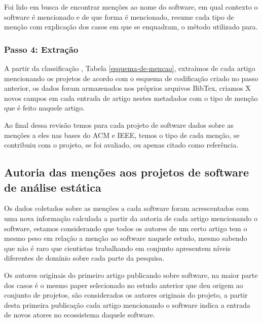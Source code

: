 Foi lido em busca de encontrar menções ao nome do software, em qual contexto o
software é mencionado e de que forma é mencionado, resume cada tipo de menção com explicação dos casos em
que se enquadram, o método utilizado para.

\subsubsection{Passo 4: Extração}

A partir da classificação , Tabela \ref{esquema-de-mencao}, extraímos de cada
artigo mencionando os projetos de acordo com o esquema de codificação criado no
passo anterior, os dados foram armazenados nos próprios arquivos BibTex,
criamos X novos campos em cada entrada de artigo nestes metadados com o tipo de
menção que é feito naquele artigo.

Ao final dessa revisão temos para cada projeto de software dados sobre as
menções a eles nas bases do ACM e IEEE, temos o tipo de cada menção, se
contribuiu com o projeto, se foi avaliado, ou apenas citado como referência.

\subsection{Autoria das menções aos projetos de software de análise estática}


Os dados coletados sobre as menções a cada software foram acrescentados com uma
nova informação calculada a partir da autoria de cada artigo mencionando o
software, estamos considerando que todos os autores de um certo artigo tem o
mesmo peso em relação a menção ao software naquele estudo, mesmo sabendo que não
é raro que cientistas trabalhando em conjunto apresentem níveis diferentes de
domínio sobre cada parte da pesquisa.

Os autores originais do primeiro artigo publicando sobre software, na maior
parte dos casos é o mesmo paper selecionado no estudo anterior que deu origem
ao conjunto de projetos, são considerados os autores originais do projeto, a
partir desta primeira publicação cada artigo mencionando o software indica a
entrada de novos atores no ecossistema daquele software.

